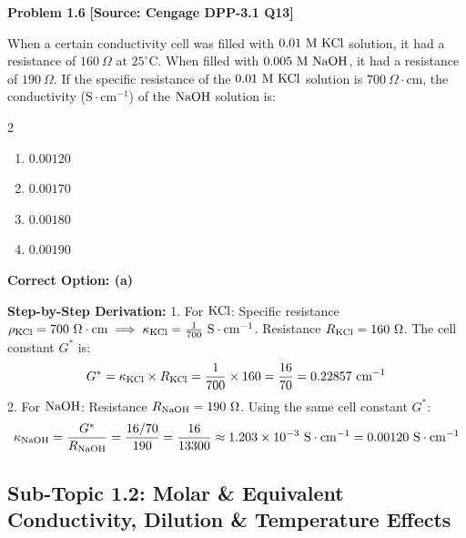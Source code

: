 \begin{problembox}
\textbf{Problem 1.6} \hfill \textbf{[Source: Cengage DPP-3.1 Q13]}

When a certain conductivity cell was filled with $0.01\text{ M } \ce{KCl}$ solution, it had a resistance of $160\ \Omega$ at $25^\circ\text{C}$. When filled with $0.005\text{ M } \ce{NaOH}$, it had a resistance of $190\ \Omega$. If the specific resistance of the $0.01\text{ M } \ce{KCl}$ solution is $700\ \Omega\cdot\text{cm}$, the conductivity ($\text{S}\cdot\text{cm}^{-1}$) of the $\ce{NaOH}$ solution is:
\begin{multicols}{2}
\begin{enumerate}[label=(\alph*)]
    \item $0.00120$
    \item $0.00170$
    \item $0.00180$
    \item $0.00190$
\end{enumerate}
\end{multicols}
\end{problembox}
\begin{solution}
\textbf{Correct Option: (a)}

\textbf{Step-by-Step Derivation:}
1. For $\ce{KCl}$: Specific resistance $\rho_{\ce{KCl}} = 700\ \Omega\cdot\text{cm} \implies \kappa_{\ce{KCl}} = \frac{1}{700}\ \text{S}\cdot\text{cm}^{-1}$.
Resistance $R_{\ce{KCl}} = 160\ \Omega$.
The cell constant $G^*$ is:
\begin{equation*}
    G^* = \kappa_{\ce{KCl}} \times R_{\ce{KCl}} = \frac{1}{700} \times 160 = \frac{16}{70} = 0.22857\text{ cm}^{-1}
\end{equation*}
2. For $\ce{NaOH}$:
Resistance $R_{\ce{NaOH}} = 190\ \Omega$.
Using the same cell constant $G^*$:
\begin{equation*}
    \kappa_{\ce{NaOH}} = \frac{G^*}{R_{\ce{NaOH}}} = \frac{16/70}{190} = \frac{16}{13300} \approx 1.203 \times 10^{-3}\ \text{S}\cdot\text{cm}^{-1} = 0.00120\ \text{S}\cdot\text{cm}^{-1}
\end{equation*}
\end{solution}

\subsection{Sub-Topic 1.2: Molar \& Equivalent Conductivity, Dilution \& Temperature Effects}

